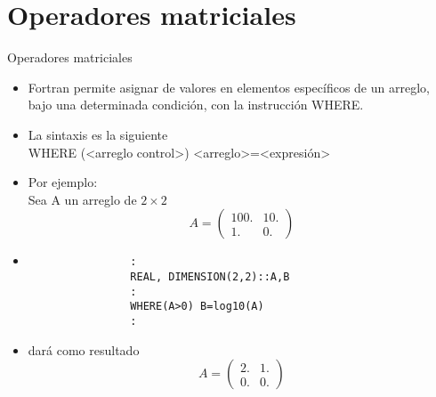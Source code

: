 
\section{Operadores matriciales}  



\begin{frame}[fragile]{Operadores matriciales} 
    \begin{itemize}[<+(0->]
        \item Fortran permite asignar de valores en elementos específicos de un arreglo, bajo una determinada condición, con la instrucción WHERE. 
        \item La sintaxis es la siguiente \\
            \centering WHERE (<arreglo control>) <arreglo>=<expresión> 
        \item [] Por ejemplo: \\ 
            Sea A un arreglo de $2 \times 2$ 
            $$
                A = \left( \begin{array}{cc}
                    100. & 10. \\
                    1. & 0. \end{array} \right)
            $$
        \item [] 
            \begin{verbatim}
                :
                REAL, DIMENSION(2,2)::A,B
                :
                WHERE(A>0) B=log10(A)
                : 
            \end{verbatim}
        \item [] dará como resultado
            $$
                A = \left( \begin{array}{cc}
                    2. & 1. \\
                    0. & 0. \end{array} \right)
            $$   
    \end{itemize}
\end{frame}